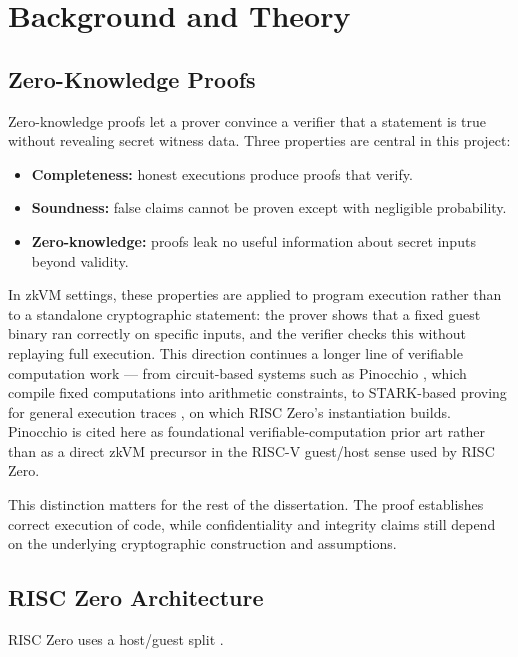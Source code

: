 \chapter{Background and Theory}

\section{Zero-Knowledge Proofs}

Zero-knowledge proofs let a prover convince a verifier that a statement is true
without revealing secret witness data. Three properties are central in this
project:

\begin{itemize}
\item \textbf{Completeness:} honest executions produce proofs that verify.
\item \textbf{Soundness:} false claims cannot be proven except with negligible
probability.
\item \textbf{Zero-knowledge:} proofs leak no useful information about secret
inputs beyond validity.
\end{itemize}

In zkVM settings, these properties are applied to program execution rather than
to a standalone cryptographic statement: the prover shows that a fixed guest
binary ran correctly on specific inputs, and the verifier checks this without
replaying full execution. This direction continues a longer line of verifiable
computation work --- from circuit-based systems such as Pinocchio
\cite{parno2013pinocchio}, which compile fixed computations into arithmetic
constraints, to STARK-based proving for general execution traces
\cite{bensasson2018stark,risczeroStarkProtocol}, on which RISC Zero's
instantiation builds. Pinocchio
is cited here as foundational verifiable-computation prior art rather than as a
direct zkVM precursor in the RISC-V guest/host sense used by RISC Zero.

This distinction matters for the rest of the dissertation. The proof establishes
correct execution of code, while confidentiality and integrity claims still
depend on the underlying cryptographic construction and assumptions.

\section{RISC Zero Architecture}

RISC Zero uses a host/guest split \cite{risczeroDocs}.

